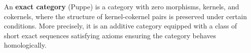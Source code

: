 An \textbf{exact category} (Puppe) is a category with zero morphisms, kernels, and cokernels, where the structure of kernel-cokernel pairs is preserved under certain conditions. More precisely, it is an additive category equipped with a class of short exact sequences satisfying axioms ensuring the category behaves homologically.